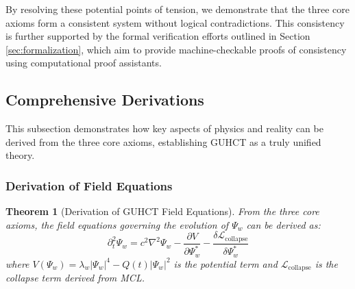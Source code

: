 \documentclass[11pt,a4paper]{article}
\makeatletter
\newtheorem{theorem}{Theorem}[section]
\renewenvironment{proof}[1][\proofname]{\par
  \pushQED{\qed}%
  \normalfont \topsep6\p@\@plus6\p@\relax
  \trivlist
  \item[\hskip\labelsep
        \itshape
    #1\@addpunct{.}]\ignorespaces
}{%
  \popQED\endtrivlist\@endpefalse
}
\makeatother
\begin{document}
\begin{proof}
By resolving these potential points of tension, we demonstrate that the three core axioms form a consistent system without logical contradictions. This consistency is further supported by the formal verification efforts outlined in Section \ref{sec:formalization}, which aim to provide machine-checkable proofs of consistency using computational proof assistants.
\end{proof}

\subsection{Comprehensive Derivations}
\label{subsec:comprehensive_derivations_axioms} %

This subsection demonstrates how key aspects of physics and reality can be derived from the three core axioms, establishing GUHCT as a truly unified theory.

\subsubsection{Derivation of Field Equations}
\label{ssubsec:field_equations_derivation_axioms} %

\begin{theorem}[Derivation of GUHCT Field Equations]
\label{thm:field_equations_derivation_axioms_thm} %
From the three core axioms, the field equations governing the evolution of $\Psi_w$ can be derived as:
\begin{equation}
\partial_t^2\Psi_w = c^2\nabla^2\Psi_w - \frac{\partial V}{\partial \Psi_w^*} - \frac{\delta \mathcal{L}_{\text{collapse}}}{\delta \Psi_w^*}
\end{equation}
where $V(\Psi_w) = \lambda_w|\Psi_w|^4 - Q(t)|\Psi_w|^2$ is the potential term and $\mathcal{L}_{\text{collapse}}$ is the collapse term derived from MCL.
\end{theorem}
\end{document}
